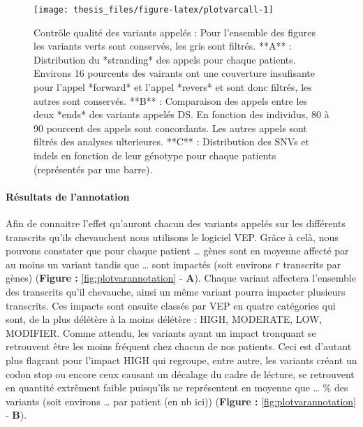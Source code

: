 \documentclass[12pt,twoside]{reedthesis}
\theoremstyle{definition}
\theoremstyle{definition}
\theoremstyle{remark}
\begin{document}
  \begin{figure}
  
  {\centering \texttt{[image: thesis\_files/figure-latex/plotvarcall-1]} 
  
  }
  
  \caption[Contrôle qualité des variants appelés]{Contrôle qualité des variants appelés : Pour l'ensemble des figures les variants verts sont conservés, les gris sont filtrés. **A** : Distribution du *stranding* des appels pour chaque patients. Environs 16 pourcents des vairants ont une couverture insufisante pour l'appel *forward* et l'appel *revers* et sont donc filtrés, les autres sont conservés. **B** : Comparaison des appels entre les deux *ends* des variants appelés DS. En fonction des individus, 80 à 90 pourcent des appels sont concordants. Les autres appels sont filtrés des analyses ulterieures. **C** : Distribution des SNVs et indels en fonction de leur génotype pour chaque patients (représentés par une barre).}\label{fig:plotvarcall}
  \end{figure}
  
  \newpage
  
  \paragraph{Résultats de l'annotation}\label{resultats-de-lannotation}
  
  Afin de connaitre l'effet qu'auront chacun des variants appelés sur les
  différents transcrits qu'ils chevauchent nous utilisons le logiciel VEP.
  Grâce à celà, nous pouvons constater que pour chaque patient \ldots{}
  gènes sont en moyenne affecté par au moins un variant tandis que
  \ldots{} sont impactés (soit environs \texttt{r} transcrits par gènes)
  (\textbf{Figure : }\ref{fig:plotvarannotation} - \textbf{A}). Chaque
  variant affectera l'ensemble des transcrits qu'il chevauche, ainsi un
  même variant pourra impacter plusieurs transcrits. Ces impacts sont
  ensuite classés par VEP en quatre catégories qui sont, de la plus
  délétère à la moins délétère : HIGH, MODERATE, LOW, MODIFIER. Comme
  attendu, les variants ayant un impact tronquant se retrouvent être les
  moins fréquent chez chacun de nos patients. Ceci est d'autant plus
  flagrant pour l'impact HIGH qui regroupe, entre autre, les variants
  créant un codon stop ou encore ceux causant un décalage du cadre de
  lécture, se retrouvent en quantité extrêment faible puisqu'ils ne
  représentent en moyenne que \ldots{} \% des variants (soit environs
  \ldots{} par patient (en nb ici)) (\textbf{Figure :
  }\ref{fig:plotvarannotation} - \textbf{B}).
  
\end{document}
